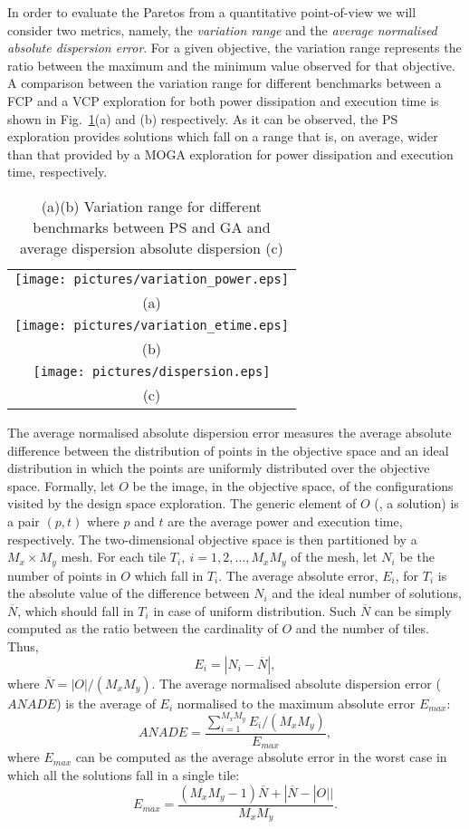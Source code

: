 In order to evaluate the Paretos from a quantitative point-of-view we
will consider two metrics, namely, the \emph{variation range} and the
\emph{average normalised absolute dispersion error}. For a given
objective, the variation range represents the ratio between the
maximum and the minimum value observed for that objective. A
comparison between the variation range for different benchmarks
between a FCP and a VCP exploration for both power dissipation and
execution time is shown in Fig.~\ref{fig:dispersion}(a) and (b)
respectively. As it can be observed, the PS exploration provides solutions which fall on a
range that is, on average, wider than that provided by a
MOGA exploration for power dissipation and execution time, respectively.
\begin{table}
  \centering
  \begin{tabular}{c}
    \texttt{[image: pictures/variation\_power.eps]} \\
    (a) \\
    \texttt{[image: pictures/variation\_etime.eps]} \\
    (b) \\
    \texttt{[image: pictures/dispersion.eps]} \\
    (c) 
  \end{tabular}
  \caption{(a)(b) Variation range for different benchmarks between PS and GA
  and average dispersion absolute dispersion (c)}
  \label{fig:dispersion}
\end{table}

The average normalised absolute dispersion error measures
the average absolute difference between the distribution of points in
the objective space and an ideal distribution in which the points are
uniformly distributed over the objective space. Formally, let $O$ be
the image, in the objective space, of the configurations visited by
the design space exploration. The generic element of $O$ (\ie, a
solution) is a pair $(p,t)$ where $p$ and $t$ are the average power
and execution time, respectively. The two-dimensional objective space
is then partitioned by a $M_x \times M_y$ mesh. For each tile $T_i,
\ i=1, 2, \ldots, M_xM_y$ of the mesh, let $N_i$ be the number
of points in $O$ which fall in $T_i$. The average absolute error, $E_i$, for
$T_i$ is the absolute value of the difference between $N_i$ and the
ideal number of solutions, $\overline{N}$, which should fall in $T_i$
in case of uniform distribution. Such $\overline{N}$ can be simply
computed as the ratio between the cardinality of $O$ and the number of
tiles. Thus,
\[ E_i = |N_i - \overline{N}|, \]
where $\overline{N} = |O| / (M_x M_y)$. The average
normalised absolute dispersion error ($ANADE$) is the average of $E_i$
normalised to the maximum absolute error $E_{max}$:
\[ ANADE = \frac{\sum_{i=1}^{M_xM_y} E_i/(M_xM_y)}{E_{max}}, \]
where $E_{max}$ can be computed as the average absolute error in the worst
case in which all the solutions fall in a single tile:
\[ E_{max} = \frac{(M_x M_y - 1) \overline{N} + |\overline{N} -
    |O|| }{M_x M_y}. \] 

